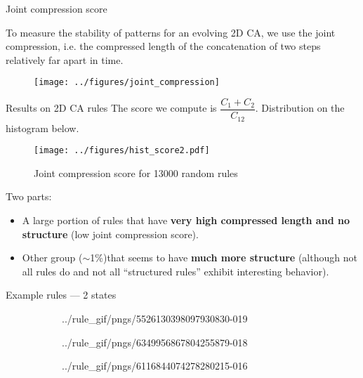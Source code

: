 \documentclass[xcolor=dvipsnames]{beamer}
\begin{document}
\begin{frame}{Joint compression score}

  To measure the \alert{stability} of patterns for an evolving 2D CA, we use the
  joint compression, i.e. the compressed length of the concatenation of two
  steps relatively far apart in time.

  \begin{figure}[htbp]
    \centering
    \texttt{[image: ../figures/joint\_compression]}
    \label{fig:joint_comp}
  \end{figure}

\end{frame}

\begin{frame}{Results on 2D CA rules}
  The score we compute is $\dfrac{C_1 + C_2}{C_{12}}$. Distribution on the
  histogram below.

  \begin{minipage}[h]{.49\linewidth}
    \begin{figure}[htbp]
      \centering
      \texttt{[image: ../figures/hist\_score2.pdf]}
      \caption{Joint compression score for 13000 random rules}
      \label{fig:joint_hist}
    \end{figure}
  \end{minipage}
  \begin{minipage}[h]{.49\linewidth}
    Two parts:
    \begin{itemize}
    \item A large portion of rules that have \textbf{very high compressed length
        and no structure} (low joint compression score).
    \item Other group ($\sim$1\%)that seems to have \textbf{much more structure}
      (although not all rules do and not all ``structured rules'' exhibit
      interesting behavior).
    \end{itemize}
  \end{minipage}

\end{frame}

\begin{frame}{Example rules --- 2 states}
  \begin{figure}[htbp]
    \centering
    \begin{subfigure}{.32\linewidth}
      \centering
      {../rule_gif/pngs/5526130398097930830-}{0}{19}
    \end{subfigure}
    \begin{subfigure}{.32\linewidth}
      \centering
      {../rule_gif/pngs/6349956867804255879-}{0}{18}
    \end{subfigure}
    \begin{subfigure}{.32\linewidth}
      \centering
      {../rule_gif/pngs/6116844074278280215-}{0}{16}
    \end{subfigure}
  \end{figure}
\end{frame}
\end{document}
